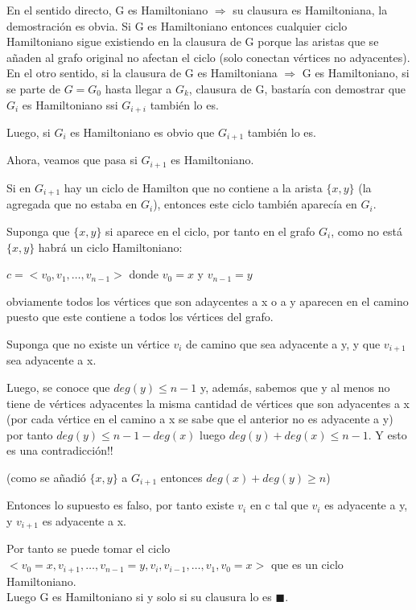 \documentclass[a4paper,1pt]{report}
\begin{document}
En el sentido directo, G es Hamiltoniano $\Rightarrow$ su clausura es Hamiltoniana, la demostración es obvia. Si G es Hamiltoniano entonces cualquier ciclo Hamiltoniano sigue existiendo en la clausura de G porque las aristas que se añaden al grafo original no afectan el ciclo (solo conectan vértices no adyacentes).\\
  
En el otro sentido, si la clausura de G es Hamiltoniana $\Rightarrow$ G es Hamiltoniano, si se parte de $G=G_0$ hasta llegar a $G_k$, clausura de G, bastaría con demostrar que $G_i$ es Hamiltoniano ssi $G_{i+i}$ también lo es.

Luego, si $G_i$ es Hamiltoniano es obvio que $G_{i+1}$ también lo es.

Ahora, veamos que pasa si $G_{i+1}$ es Hamiltoniano.

Si en $G_{i+1}$ hay un ciclo de Hamilton que no contiene a la arista $\{x,y\}$ (la agregada que no estaba en $G_i$), entonces este ciclo también aparecía en $G_i$.

Suponga que $\{x,y\}$ si aparece en el ciclo, por tanto en el grafo $G_i$, como no está $\{x,y\}$ habrá un ciclo Hamiltoniano: 

$c=<v_0,v_1,\dots,v_{n-1}>$ donde $v_0=x$ y $v_{n-1}=y$

obviamente todos los vértices que son adaycentes a x o a y aparecen en el camino puesto que este contiene a todos los vértices del grafo.

Suponga que no existe un vértice $v_i$ de camino que sea adyacente a y, y que $v_{i+1}$ sea adyacente a x. 

Luego, se conoce que $deg(y)\leq n-1$ y, además, sabemos que y al menos no tiene de vértices adyacentes la misma cantidad de vértices que son adyacentes a x (por cada vértice en el camino a x se sabe que el anterior no es adyacente a y) por tanto $deg(y)\leq n-1 - deg(x)$ luego $deg(y) + deg(x)\leq n-1 $. Y esto es una contradicción!! 

(como se añadió $\{x,y\}$  a $G_{i+1}$ entonces $deg(x)+deg(y)\geq n$)

Entonces lo supuesto es falso, por tanto existe $v_i$ en c tal que $v_i$ es adyacente a y, y $v_{i+1}$ es adyacente a x. 

Por tanto se puede tomar el ciclo $<v_0=x,v_{i+1},\dots,v_{n-1}=y,v_i,v_{i-1},\dots,v_1,v_0=x>$ que es un ciclo Hamiltoniano.\\

Luego G es Hamiltoniano si y solo si su clausura lo es $\blacksquare$.
\end{document}
